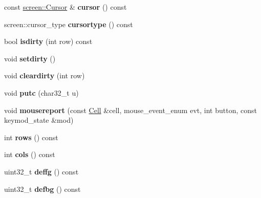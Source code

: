 \begin{DoxyCompactItemize}
\mbox{\label{classterm_1_1Term_a154434f4cfba0974a91bf5a30d01b60e}} 
const \mbox{\hyperlink{structscreen_1_1Cursor}{screen\+::\+Cursor}} \& {\bfseries cursor} () const
\item 
\mbox{\label{classterm_1_1Term_ac1b20ed5a1dc18a9e1e78868d8efb9d4}} 
screen\+::cursor\+\_\+type {\bfseries cursortype} () const
\item 
\mbox{\label{classterm_1_1Term_a70e13add10b166921df06d9b1825ff19}} 
bool {\bfseries isdirty} (int row) const
\item 
\mbox{\label{classterm_1_1Term_acd15168fcf07a4c45ec62cd4f6e577e4}} 
void {\bfseries setdirty} ()
\item 
\mbox{\label{classterm_1_1Term_a32b97a43b70ca41750af4fd9819641d4}} 
void {\bfseries cleardirty} (int row)
\item 
\mbox{\label{classterm_1_1Term_ac079a8defcd6618390246aa4fdf20c6a}} 
void {\bfseries putc} (char32\+\_\+t u)
\item 
\mbox{\label{classterm_1_1Term_aafe082fe47b98e5a67e2c10c824215fa}} 
void {\bfseries mousereport} (const \mbox{\hyperlink{structCell}{Cell}} \&cell, mouse\+\_\+event\+\_\+enum evt, int button, const keymod\+\_\+state \&mod)
\item 
\mbox{\label{classterm_1_1Term_aceb5c395c0d2e15bd1bc0cddc65df1e8}} 
int {\bfseries rows} () const
\item 
\mbox{\label{classterm_1_1Term_afafeaab31eff6adc8d5fd2d587e20f9b}} 
int {\bfseries cols} () const
\item 
\mbox{\label{classterm_1_1Term_aa7860748446024295b71ed7278571c55}} 
uint32\+\_\+t {\bfseries deffg} () const
\item 
\mbox{\label{classterm_1_1Term_a818b1488bd0bf835329c0cdbdf36f264}} 
uint32\+\_\+t {\bfseries defbg} () const
\item 
\mbox{\label{classterm_1_1Term_ad7dcf814a1af4ccd9a959f0c87775212}} 

\end{DoxyCompactItemize}
